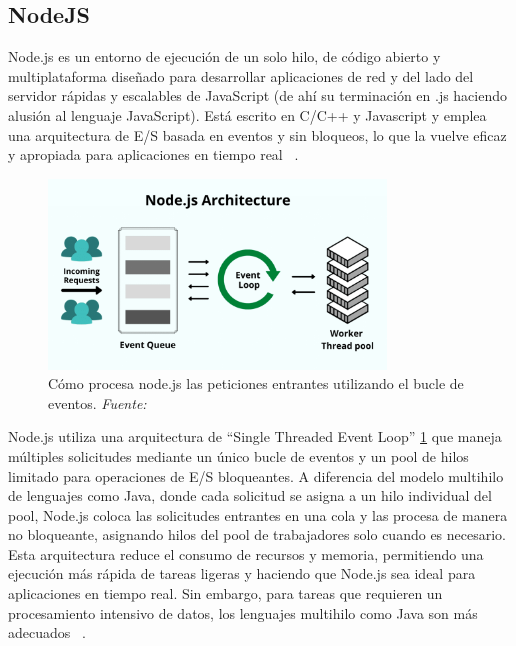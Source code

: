 \subsection{NodeJS}
Node.js es un entorno de ejecución de un solo hilo, de código abierto y multiplataforma diseñado para desarrollar aplicaciones de red y del lado del servidor rápidas y escalables de JavaScript (de ahí su terminación en .js haciendo alusión al lenguaje JavaScript). Está escrito en C/C++ y Javascript y emplea una arquitectura de E/S basada en eventos y sin bloqueos, lo que la vuelve eficaz y apropiada para aplicaciones en tiempo real ~\cite{NodeJSKinsta}. 

\begin{figure}[H]
	\centering
	\includegraphics[width=0.8\textwidth]{img/chapter03/node-architecture.png}
	\caption[Cómo procesa node.js las peticiones entrantes utilizando el bucle de eventos]{Cómo procesa node.js las peticiones entrantes utilizando el bucle de eventos. \textit{Fuente: ~\cite{NodeJSKinsta}}}
	\label{fig:nodejs_arqui}  %
\end{figure}
Node.js utiliza una arquitectura de “Single Threaded Event Loop” \ref{fig:nodejs_arqui} que maneja múltiples solicitudes mediante un único bucle de eventos y un pool de hilos limitado para operaciones de E/S bloqueantes. A diferencia del modelo multihilo de lenguajes como Java, donde cada solicitud se asigna a un hilo individual del pool, Node.js coloca las solicitudes entrantes en una cola y las procesa de manera no bloqueante, asignando hilos del pool de trabajadores solo cuando es necesario. Esta arquitectura reduce el consumo de recursos y memoria, permitiendo una ejecución más rápida de tareas ligeras y haciendo que Node.js sea ideal para aplicaciones en tiempo real. Sin embargo, para tareas que requieren un procesamiento intensivo de datos, los lenguajes multihilo como Java son más adecuados ~\cite{NodeJSKinsta}.

